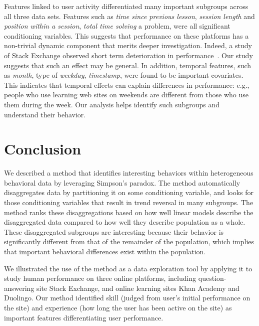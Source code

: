 \documentclass[letterpaper]{article} %
\begin{document}
Features linked to user activity differentiated many important subgroups across all three data sets. Features such as \emph{time since previous lesson}, \emph{session length} and \emph{position within a session}, \emph{total time solving} a problem, were all significant conditioning variables. This suggests that performance on these platforms has a non-trivial dynamic component that merits deeper investigation. Indeed, a study of Stack Exchange observed short term deterioration in performance~\cite{Ferrara2017dynamics}. Our study suggests that such an effect may be general.
In addition, temporal features, such as \emph{month}, type of \emph{weekday}, \emph{timestamp}, were found to be important covariates. This indicates that temporal effects can explain differences in performance: e.g., people who use learning web sites on weekends are different from those who use them during the week. Our analysis helps identify such subgroups and understand their behavior.


\section{Conclusion}
We described a method that identifies interesting behaviors within heterogeneous behavioral data by leveraging Simpson's paradox. The method automatically disaggregates data by partitioning it on some conditioning variable, and looks for those conditioning variables that result in trend reversal in many subgroups.
The method ranks these disaggregations based on how well linear models describe the disaggregated data compared to how well they describe population as a whole. These disaggregated subgroups are interesting because their behavior is significantly different from that of the remainder of the population, which implies that important behavioral differences exist within the population.

We illustrated the use of the method as a data exploration tool by applying it to study human performance on three online platforms, including question-answering site Stack Exchange, and online learning sites Khan Academy and Duolingo. Our method identified skill (judged from user's initial performance on the site) and experience (how long the user has been active on the site) as important features differentiating user performance.
\end{document}
